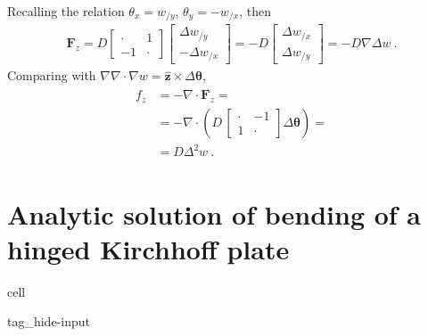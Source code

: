 \documentclass[letterpaper,10pt,english]{jupyterBook}
\begin{document}
\sphinxAtStartPar
Recalling the relation \(\theta_x = w_{/y}\), \(\theta_y = - w_{/x}\), then
\begin{equation*}
\begin{split}\mathbf{F}_z = D \begin{bmatrix} \cdot & 1 \\ -1 & \cdot \end{bmatrix} \begin{bmatrix} \Delta w_{/y} \\ - \Delta w_{/x} \end{bmatrix} = - D \begin{bmatrix} \Delta w_{/x} \\ \Delta w_{/y} \end{bmatrix} = - D \nabla \Delta w \ .\end{split}
\end{equation*}
\sphinxAtStartPar
Comparing with \(\nabla \nabla \cdot \nabla w = \hat{\mathbf{z}} \times \Delta \boldsymbol\theta\),
\begin{equation*}
\begin{split}\begin{aligned}
  f_z
  & = - \nabla \cdot \mathbf{F}_z = \\
  & = - \nabla \cdot \left( D \, \begin{bmatrix} \cdot & -1 \\ 1 & \cdot \end{bmatrix} \Delta \boldsymbol{\theta} \right) = \\
  & =   D \Delta^2 w \ .
\end{aligned}\end{split}
\end{equation*}


\sphinxstepscope


\section{Analytic solution of bending of a hinged Kirchhoff plate}
\label{\detokenize{ch/solids/plates-shells/kirchhoff-analytic-sln:analytic-solution-of-bending-of-a-hinged-kirchhoff-plate}}\label{\detokenize{ch/solids/plates-shells/kirchhoff-analytic-sln:solid-mechanics-small-displacements-plates-shells-kirchhoff-analytical}}\label{\detokenize{ch/solids/plates-shells/kirchhoff-analytic-sln::doc}}
\begin{sphinxuseclass}{cell}
\begin{sphinxuseclass}{tag_hide-input}
\end{sphinxuseclass}
\end{sphinxuseclass}
\end{document}
